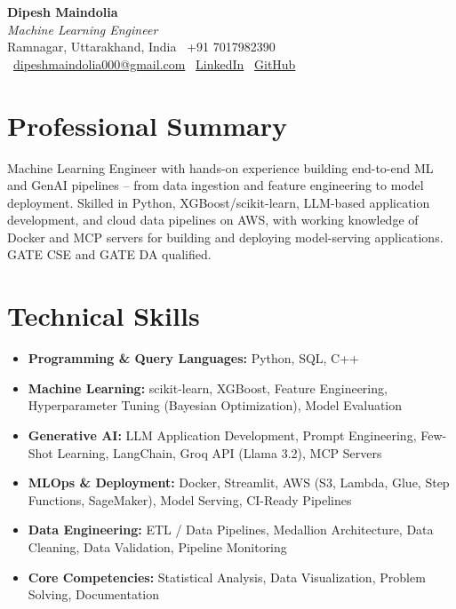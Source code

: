 \documentclass[letterpaper,8pt]{article}
\begin{document}
\begin{center}
    {\LARGE \textbf{Dipesh Maindolia}} \\[2pt]
    {\small \textit{Machine Learning Engineer}} \\[2pt]
    {\small
    Ramnagar, Uttarakhand, India \textbar\
    +91 7017982390 \textbar\
    \href{mailto:dipeshmaindolia000@gmail.com}{\color{linkblue}dipeshmaindolia000@gmail.com}
    \textbar\
    \href{https://linkedin.com/in/dipeshmaindolia}{\color{linkblue}LinkedIn}
    \textbar\
    \href{https://github.com/dipeshmaindolia001}{\color{linkblue}GitHub}
    }
\end{center}

\vspace{-15pt}

\section{Professional Summary}
\small{Machine Learning Engineer with hands-on experience building end-to-end ML and GenAI pipelines --
from data ingestion and feature engineering to model deployment. Skilled in Python, XGBoost/scikit-learn,
LLM-based application development, and cloud data pipelines on AWS, with working knowledge of Docker and
MCP servers for building and deploying model-serving applications. GATE CSE and GATE DA qualified.}

\vspace{-15pt}

\section{Technical Skills}
\begin{itemize}
    \item \textbf{Programming \& Query Languages:} Python, SQL, C++
    \item \textbf{Machine Learning:} scikit-learn, XGBoost, Feature Engineering, Hyperparameter Tuning (Bayesian Optimization), Model Evaluation
    \item \textbf{Generative AI:} LLM Application Development, Prompt Engineering, Few-Shot Learning, LangChain, Groq API (Llama 3.2), MCP Servers
    \item \textbf{MLOps \& Deployment:} Docker, Streamlit, AWS (S3, Lambda, Glue, Step Functions, SageMaker), Model Serving, CI-Ready Pipelines
    \item \textbf{Data Engineering:} ETL / Data Pipelines, Medallion Architecture, Data Cleaning, Data Validation, Pipeline Monitoring
    \item \textbf{Core Competencies:} Statistical Analysis, Data Visualization, Problem Solving, Documentation
\end{itemize}
\end{document}
